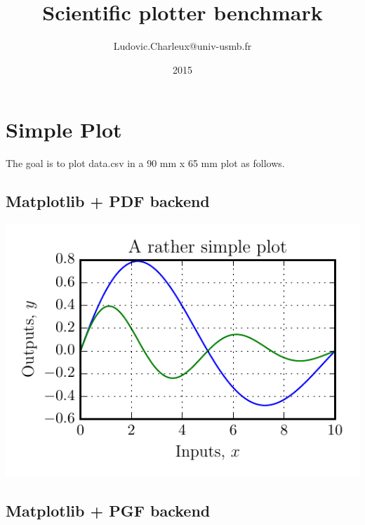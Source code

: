 \documentclass[10pt,a4paper,oneside,onecolumn]{article}
\author{Ludovic.Charleux@univ-usmb.fr}
\title{Scientific plotter benchmark}
\date{2015}
\begin{document}
\maketitle
\tableofcontents
\newpage

\section{Simple Plot}

The goal is to plot data.csv in a 90 mm x 65 mm plot as follows.

\subsection{Matplotlib + PDF backend}
\begin{center}
\includegraphics{simple_plot/mpl.pdf}
\end{center}

\subsection{Matplotlib + PGF backend}
\begin{center}

\end{center}
\end{document}
